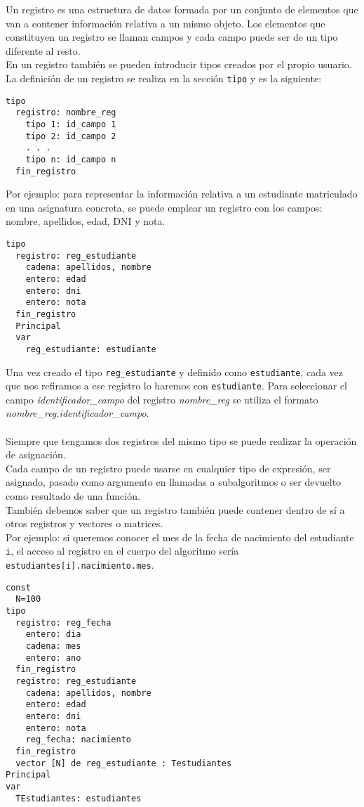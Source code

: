\documentclass[12pt,letterpaper]{article}
\begin{document}
Un registro es una estructura de datos formada por un conjunto de elementos que van a contener información relativa a un mismo objeto. Los elementos que constituyen un registro se llaman campos y cada campo puede ser de un tipo diferente al resto.\\
En un registro también se pueden introducir tipos creados por el propio usuario.\\
La definición de un registro se realiza en la sección \texttt{tipo} y es la siguiente:
\begin{lstlisting}
tipo
  registro: nombre_reg
    tipo 1: id_campo 1
    tipo 2: id_campo 2
    . . .
    tipo n: id_campo n
  fin_registro
\end{lstlisting}
Por ejemplo: para representar la información relativa a un estudiante matriculado en una asignatura concreta, se puede emplear un registro con los campos: nombre, apellidos, edad, DNI y nota.
\begin{lstlisting}
tipo
  registro: reg_estudiante
    cadena: apellidos, nombre
    entero: edad
    entero: dni
    entero: nota
  fin_registro
  Principal
  var
    reg_estudiante: estudiante
\end{lstlisting}
Una vez creado el tipo \texttt{reg\_estudiante} y definido como \texttt{estudiante}, cada vez que nos refiramos a ese registro lo haremos con \texttt{estudiante}. Para seleccionar el campo \textit{identificador\_campo} del registro \textit{nombre\_reg} se utiliza el formato \textit{nombre\_reg.identificador\_campo}.\\\\
Siempre que tengamos dos registros del mismo tipo se puede realizar la operación de asignación.\\
Cada campo de un registro puede usarse en cualquier tipo de expresión, ser asignado, pasado como argumento en llamadas a subalgoritmos o ser devuelto como resultado de una función.\\
También debemos saber que un registro también puede contener dentro de sí a otros registros y vectores o matrices.\\
Por ejemplo: si queremos conocer el mes de la fecha de nacimiento del estudiante \texttt{i}, el acceso al registro en el cuerpo del algoritmo sería \texttt{estudiantes[i].nacimiento.mes}.
\begin{lstlisting}
const
  N=100
tipo
  registro: reg_fecha
    entero: dia
    cadena: mes
    entero: ano
  fin_registro
  registro: reg_estudiante
    cadena: apellidos, nombre
    entero: edad
    entero: dni
    entero: nota
    reg_fecha: nacimiento
  fin_registro
  vector [N] de reg_estudiante : Testudiantes
Principal
var
  TEstudiantes: estudiantes
\end{lstlisting}
\end{document}
